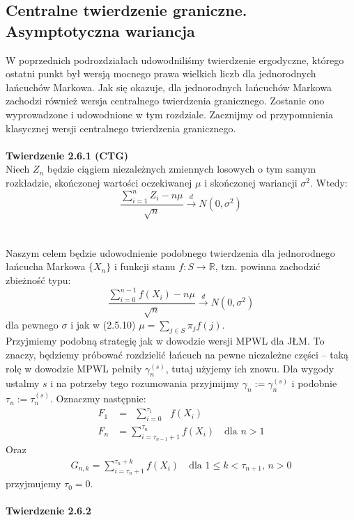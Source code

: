 \documentclass[a4paper]{article}
\begin{document}
\subsection{Centralne twierdzenie graniczne. Asymptotyczna wariancja}
W poprzednich podrozdziałach udowodniliśmy twierdzenie ergodyczne, którego ostatni punkt był wersją mocnego prawa wielkich liczb dla jednorodnych łańcuchów Markowa. Jak się okazuje, dla jednorodnych łańcuchów Markowa zachodzi również wersja centralnego twierdzenia granicznego. Zostanie ono wyprowadzone i udowodnione w tym rozdziale. Zacznijmy od przypomnienia klasycznej wersji centralnego twierdzenia granicznego.\\
\\
\textbf{Twierdzenie 2.6.1 (CTG)}\\
Niech $Z_n$ będzie ciągiem niezależnych zmiennych losowych o tym samym rozkładzie, skończonej wartości oczekiwanej $\mu$ i skończonej wariancji $\sigma^2$. Wtedy:
$$\frac{\sum\limits_{i=1}^n Z_i - n\mu}{\sqrt{n}} \overset{d}{\to} N(0, \sigma^2)$$
\\
\\
Naszym celem będzie udowodnienie podobnego twierdzenia dla jednorodnego łańcucha Markowa $\{X_n\}$ i funkcji stanu $f: S \to \mathbb{R}$, tzn. powinna zachodzić zbieżność typu:
$$ \frac{\sum\limits_{i=0}^{n-1} f(X_i) - n\mu}{\sqrt{n}} \overset{d}{\to} N(0, \sigma^2)$$
dla pewnego $\sigma$ i jak w (2.5.10) $\mu = \sum\limits_{j \in S} \pi_j f(j)$. \\
Przyjmiemy podobną strategię jak w dowodzie wersji MPWL dla JŁM. To znaczy, będziemy próbować rozdzielić łańcuch na pewne niezależne części – taką rolę w dowodzie MPWL pełniły $\gamma_n^{(s)}$, tutaj użyjemy ich znowu. Dla wygody ustalmy $s$ i na potrzeby tego rozumowania przyjmijmy $\gamma_n := \gamma_n^{(s)}$ i podobnie $\tau_n := \tau_n^{(s)}$. 
Oznaczmy następnie:
\begin{align*}
    F_1 &= \,\,\,\sum\limits_{i = 0}^{\tau_1} \,\,\,\,f(X_i)\\
    F_n &= \sum\limits_{i = \tau_{n-1}+1}^{\tau_n} f(X_i) \quad \text{dla $n > 1$}
\end{align*}
Oraz 
\begin{align*}
    G_{n, k} = \sum\limits_{i = \tau_n+1}^{\tau_n+k} f(X_i) \quad \text{dla $1 \leq k < \tau_{n+1}$, $n > 0$}
\end{align*}
przyjmujemy $\tau_0 = 0$.\\\\
\textbf{Twierdzenie 2.6.2}\\
\end{document}
